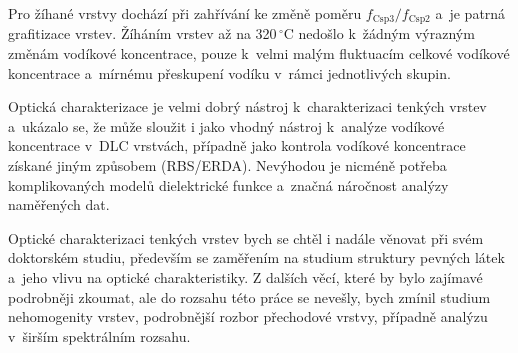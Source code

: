 Pro žíhané vrstvy dochází při zahřívání ke změně poměru $f_\mathrm{Csp3}/f_\mathrm{Csp2}$ a~je patrná grafitizace vrstev. Žíháním vrstev až na 320\,$^\circ$C nedošlo k~žádným výrazným změnám vodíkové koncentrace, pouze k~velmi malým fluktuacím celkové vodíkové koncentrace a~mírnému přeskupení vodíku v~rámci jednotlivých skupin.

Optická charakterizace je velmi dobrý nástroj k~charakterizaci tenkých vrstev a~ukázalo se, že může sloužit i jako vhodný nástroj k~analýze vodíkové koncentrace v~DLC vrstvách, případně jako kontrola vodíkové koncentrace získané jiným způsobem (RBS/ERDA). Nevýhodou je nicméně potřeba komplikovaných modelů dielektrické funkce a~značná náročnost analýzy naměřených dat.

Optické charakterizaci tenkých vrstev bych se chtěl i nadále věnovat při svém doktorském studiu, především se zaměřením na studium struktury pevných látek a~jeho vlivu na optické charakteristiky. Z dalších věcí, které by bylo zajímavé podrobněji zkoumat, ale do rozsahu této práce se nevešly, bych zmínil studium nehomogenity vrstev, podrobnější rozbor přechodové vrstvy, případně analýzu v~širším spektrálním rozsahu.

\cleardoublepage
